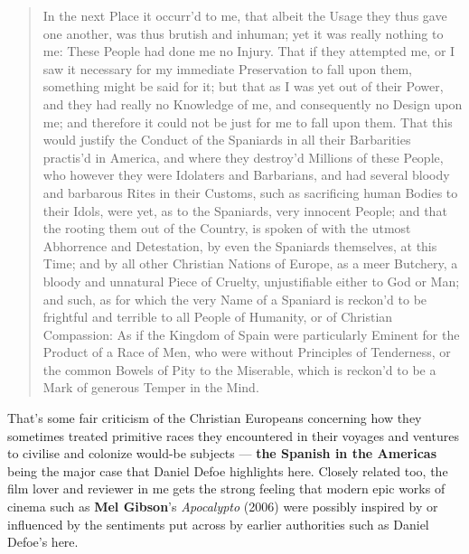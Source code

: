 \documentclass[a4paper]{article}
\begin{document}
\noindent
\begin{minipage}{1\textwidth}
\vspace{1em}
\begin{quotation}
{\ttfamily


In the next Place it occurr’d to me, that albeit the Usage they thus gave one another, was thus brutish and inhuman; yet it was really nothing to me: These People had done me no Injury. That if they attempted me, or I saw it necessary for my immediate Preservation to fall upon them, something might be said for it; but that as I was yet out of their Power, and they had really no Knowledge of me, and consequently no Design upon me; and therefore it could not be just for me to fall upon them. That this would justify the Conduct of the Spaniards in all their Barbarities practis’d in America, and where they destroy’d Millions of these People, who however they were Idolaters and Barbarians, and had several bloody and barbarous Rites in their Customs, such as sacrificing human Bodies to their Idols, were yet, as to the Spaniards, very innocent People; and that the rooting them out of the Country, is spoken of with the utmost Abhorrence and Detestation, by even the Spaniards themselves, at this Time; and by all other Christian Nations of Europe, as a meer Butchery, a bloody and unnatural Piece of Cruelty, unjustifiable either to God or Man; and such, as for which the very Name of a Spaniard is reckon’d to be frightful and terrible to all People of Humanity, or of Christian Compassion: As if the Kingdom of Spain were particularly Eminent for the Product of a Race of Men, who were without Principles of Tenderness, or the common Bowels of Pity to the Miserable, which is reckon’d to be a Mark of generous Temper in the Mind.


}
\end{quotation}
\vspace{1em}
\end{minipage}





That's some fair criticism of the Christian Europeans concerning how they sometimes treated primitive races they encountered in their voyages and ventures to civilise and colonize would-be subjects --- \textbf{the Spanish in the Americas} being the major case that Daniel Defoe highlights here. Closely related too, the film lover and reviewer in me gets the strong feeling that modern epic works of cinema such as \textbf{Mel Gibson}'s \textit{Apocalypto} (2006) were possibly inspired by or influenced by the sentiments put across by earlier authorities such as Daniel Defoe's here.
\end{document}
